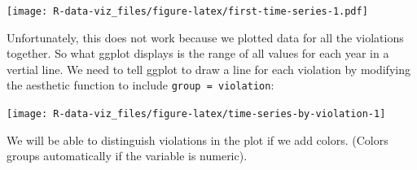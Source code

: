 \documentclass[]{book}
\newenvironment{Shaded}{\begin{snugshade}}{\end{snugshade}}
\newcommand{\KeywordTok}[1]{\textcolor[rgb]{0.13,0.29,0.53}{\textbf{#1}}}
\newcommand{\DataTypeTok}[1]{\textcolor[rgb]{0.13,0.29,0.53}{#1}}
\newcommand{\StringTok}[1]{\textcolor[rgb]{0.31,0.60,0.02}{#1}}
\newcommand{\OtherTok}[1]{\textcolor[rgb]{0.56,0.35,0.01}{#1}}
\newcommand{\OperatorTok}[1]{\textcolor[rgb]{0.81,0.36,0.00}{\textbf{#1}}}
\newcommand{\NormalTok}[1]{#1}
\theoremstyle{definition}
\theoremstyle{definition}
\theoremstyle{definition}
\theoremstyle{remark}
\begin{document}
\texttt{[image: R-data-viz\_files/figure-latex/first-time-series-1.pdf]}

Unfortunately, this does not work because we plotted data for all the
violations together. So what ggplot displays is the range of all values
for each year in a vertial line. We need to tell ggplot to draw a line
for each violation by modifying the aesthetic function to include
\texttt{group\ =\ violation}:

\begin{Shaded}
\end{Shaded}

\texttt{[image: R-data-viz\_files/figure-latex/time-series-by-violation-1]}

We will be able to distinguish violations in the plot if we add colors.
(Colors groups automatically if the variable is numeric).

\begin{Shaded}
\end{Shaded}
\end{document}
